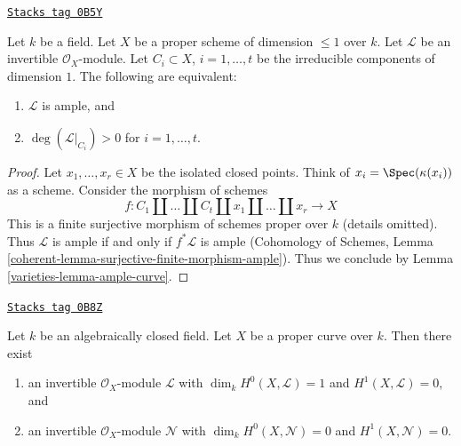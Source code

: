 \begin{lemma}
\label{varieties-lemma-ampleness-in-terms-of-degrees-components}
\href{https://stacks.math.columbia.edu/tag/0B5Y}{\texttt{Stacks tag 0B5Y}}

Let $k$ be a field. Let $X$ be a proper scheme of dimension $\leq 1$
over $k$. Let $\mathcal{L}$ be an invertible $\mathcal{O}_X$-module.
Let $C_i \subset X$, $i = 1, \ldots, t$ be the irreducible components
of dimension $1$. The following are equivalent:
\begin{enumerate}
\item $\mathcal{L}$ is ample, and
\item $\deg(\mathcal{L}|_{C_i}) > 0$ for $i = 1, \ldots, t$.
\end{enumerate}
\end{lemma}

\begin{proof}

Let $x_1, \ldots, x_r \in X$ be the isolated closed points.
Think of $x_i = \Spec(\kappa(x_i))$ as a scheme.
Consider the morphism of schemes
$$
f : C_1 \amalg \ldots \amalg C_t \amalg x_1 \amalg \ldots \amalg x_r
\longrightarrow X
$$
This is a finite surjective morphism of schemes proper over $k$
(details omitted). Thus $\mathcal{L}$ is ample if and only if
$f^*\mathcal{L}$ is ample (Cohomology of Schemes, Lemma
\ref{coherent-lemma-surjective-finite-morphism-ample}).
Thus we conclude by Lemma \ref{varieties-lemma-ample-curve}.
\end{proof}

\begin{lemma}
\label{varieties-lemma-general-degree-g-line-bundle}
\href{https://stacks.math.columbia.edu/tag/0B8Z}{\texttt{Stacks tag 0B8Z}}

Let $k$ be an algebraically closed field. Let $X$ be a proper curve over $k$.
Then there exist
\begin{enumerate}
\item an invertible $\mathcal{O}_X$-module $\mathcal{L}$ with
$\dim_k H^0(X, \mathcal{L}) = 1$ and $H^1(X, \mathcal{L}) = 0$, and
\item an invertible $\mathcal{O}_X$-module $\mathcal{N}$ with
$\dim_k H^0(X, \mathcal{N}) = 0$ and $H^1(X, \mathcal{N}) = 0$.
\end{enumerate}
\end{lemma}

